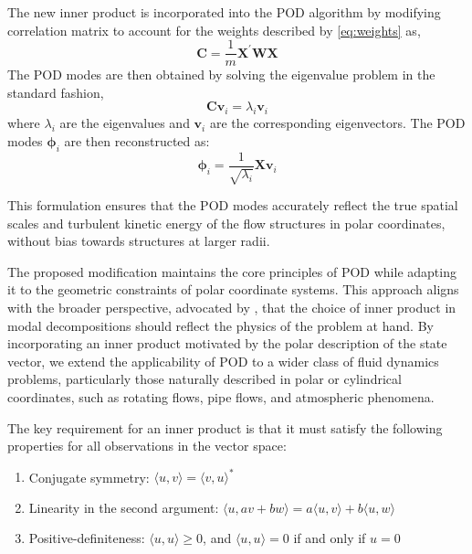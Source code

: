 \documentclass[%
 aip,
 amsmath,
 amssymb,
preprint,%
]{revtex4-2}
\begin{document}
The new inner product is incorporated into the POD algorithm by modifying correlation matrix to account for the weights described by \cref{eq:weights} as,
\begin{equation}
\mathbf{C} = \frac{1}{m}\mathbf{X}^\prime\mathbf{W}\mathbf{X}
\label{eq:weightedCorr}
\end{equation}
The POD modes are then obtained by solving the eigenvalue problem in the standard fashion,
\begin{equation}
\mathbf{C}\mathbf{v}_i = \lambda_i\mathbf{v}_i
\end{equation}
where $\lambda_i$ are the eigenvalues and $\mathbf{v}_i$ are the corresponding eigenvectors.
The POD modes $\mathbf{\phi}_i$ are then reconstructed as:
\begin{equation}
\mathbf{\phi}_i = \frac{1}{\sqrt{\lambda_i}}\mathbf{X}\mathbf{v}_i
\label{eq:modes}
\end{equation}

This formulation ensures that the POD modes accurately reflect the true spatial scales and turbulent kinetic energy of the flow structures in polar coordinates, without bias towards structures at larger radii.

The proposed modification maintains the core principles of POD while adapting it to the geometric constraints of polar coordinate systems. 
This approach aligns with the broader perspective, advocated by \citet{holmes2012turbulence}, that the choice of inner product in modal decompositions should reflect the physics of the problem at hand.
By incorporating an inner product motivated by the polar description of the state vector, we extend the applicability of POD to a wider class of fluid dynamics problems, particularly those naturally described in polar or cylindrical coordinates, such as rotating flows, pipe flows, and atmospheric phenomena.

The key requirement for an inner product is that it must satisfy the following properties for all observations in the vector space:
\begin{enumerate}
    \item Conjugate symmetry: $\langle u, v \rangle = \langle v, u \rangle^*$
    \item Linearity in the second argument: $\langle u, av + bw \rangle = a\langle u, v \rangle + b\langle u, w \rangle$
    \item Positive-definiteness: $\langle u, u \rangle \geq 0$, and $\langle u, u \rangle = 0$ if and only if $u = 0$
\end{enumerate}
\end{document}

